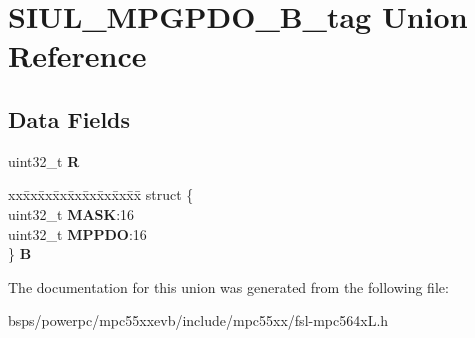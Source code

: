\hypertarget{unionSIUL__MPGPDO__32B__tag}{}\section{S\+I\+U\+L\+\_\+\+M\+P\+G\+P\+D\+O\+\_\+B\+\_\+tag Union Reference}
\label{unionSIUL__MPGPDO__32B__tag}
\subsection*{Data Fields}
\begin{DoxyCompactItemize}
\item 
\mbox{\label{unionSIUL__MPGPDO__32B__tag_ad57b7f90ea9a5498970489c3b4c419a5}} 
uint32\+\_\+t {\bfseries R}
\item 
\mbox{\label{unionSIUL__MPGPDO__32B__tag_a8123631b37d1a69e27c95770cc61126c}} 
\begin{tabbing}
xx\=xx\=xx\=xx\=xx\=xx\=xx\=xx\=xx\=\kill
struct \{\\
\>uint32\_t {\bfseries MASK}:16\\
\>uint32\_t {\bfseries MPPDO}:16\\
\} {\bfseries B}\\

\end{tabbing}\end{DoxyCompactItemize}


The documentation for this union was generated from the following file\+:\begin{DoxyCompactItemize}
\item 
bsps/powerpc/mpc55xxevb/include/mpc55xx/fsl-\/mpc564x\+L.\+h\end{DoxyCompactItemize}
